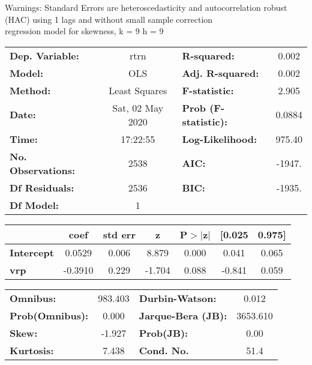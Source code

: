Warnings: \newline
 [1] Standard Errors are heteroscedasticity and autocorrelation robust (HAC) using 1 lags and without small sample correction\\ 

regression model for skewness, k = 9 h = 9\begin{center}
\begin{tabular}{lclc}
\toprule
\textbf{Dep. Variable:}    &       rtrn       & \textbf{  R-squared:         } &     0.002   \\
\textbf{Model:}            &       OLS        & \textbf{  Adj. R-squared:    } &     0.002   \\
\textbf{Method:}           &  Least Squares   & \textbf{  F-statistic:       } &     2.905   \\
\textbf{Date:}             & Sat, 02 May 2020 & \textbf{  Prob (F-statistic):} &   0.0884    \\
\textbf{Time:}             &     17:22:55     & \textbf{  Log-Likelihood:    } &    975.40   \\
\textbf{No. Observations:} &        2538      & \textbf{  AIC:               } &    -1947.   \\
\textbf{Df Residuals:}     &        2536      & \textbf{  BIC:               } &    -1935.   \\
\textbf{Df Model:}         &           1      & \textbf{                     } &             \\
\bottomrule
\end{tabular}
\begin{tabular}{lcccccc}
                   & \textbf{coef} & \textbf{std err} & \textbf{z} & \textbf{P$> |$z$|$} & \textbf{[0.025} & \textbf{0.975]}  \\
\midrule
\textbf{Intercept} &       0.0529  &        0.006     &     8.879  &         0.000        &        0.041    &        0.065     \\
\textbf{vrp}       &      -0.3910  &        0.229     &    -1.704  &         0.088        &       -0.841    &        0.059     \\
\bottomrule
\end{tabular}
\begin{tabular}{lclc}
\textbf{Omnibus:}       & 983.403 & \textbf{  Durbin-Watson:     } &    0.012  \\
\textbf{Prob(Omnibus):} &   0.000 & \textbf{  Jarque-Bera (JB):  } & 3653.610  \\
\textbf{Skew:}          &  -1.927 & \textbf{  Prob(JB):          } &     0.00  \\
\textbf{Kurtosis:}      &   7.438 & \textbf{  Cond. No.          } &     51.4  \\
\bottomrule
\end{tabular}
\end{center}

